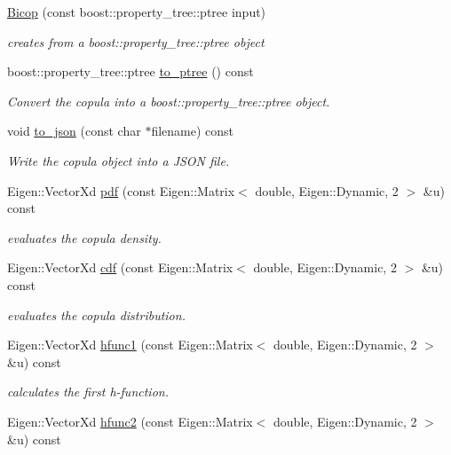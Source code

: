 \begin{DoxyCompactItemize}
\hyperlink{classvinecopulib_1_1_bicop_a48720b451adb23ede4147d4d355f4eaa}{Bicop} (const boost\+::property\+\_\+tree\+::ptree input)
\begin{DoxyCompactList}\small\item\em creates from a boost\+::property\+\_\+tree\+::ptree object \end{DoxyCompactList}\item 
boost\+::property\+\_\+tree\+::ptree \hyperlink{classvinecopulib_1_1_bicop_a74397cf5f843f5aebb436a49322dd2f9}{to\+\_\+ptree} () const
\begin{DoxyCompactList}\small\item\em Convert the copula into a boost\+::property\+\_\+tree\+::ptree object. \end{DoxyCompactList}\item 
void \hyperlink{classvinecopulib_1_1_bicop_a67cec4b86ecdae9ab4bd299fcd53ab60}{to\+\_\+json} (const char $\ast$filename) const
\begin{DoxyCompactList}\small\item\em Write the copula object into a J\+S\+ON file. \end{DoxyCompactList}\item 
Eigen\+::\+Vector\+Xd \hyperlink{classvinecopulib_1_1_bicop_a6c5a0051c17e74760d4eab394245b3f1}{pdf} (const Eigen\+::\+Matrix$<$ double, Eigen\+::\+Dynamic, 2 $>$ \&u) const
\begin{DoxyCompactList}\small\item\em evaluates the copula density. \end{DoxyCompactList}\item 
Eigen\+::\+Vector\+Xd \hyperlink{classvinecopulib_1_1_bicop_a3b0ee4b197e971f83e1d0c357c5ccdd3}{cdf} (const Eigen\+::\+Matrix$<$ double, Eigen\+::\+Dynamic, 2 $>$ \&u) const
\begin{DoxyCompactList}\small\item\em evaluates the copula distribution. \end{DoxyCompactList}\item 
Eigen\+::\+Vector\+Xd \hyperlink{classvinecopulib_1_1_bicop_ae6d42fab3bc19b807f41ccecfc80de46}{hfunc1} (const Eigen\+::\+Matrix$<$ double, Eigen\+::\+Dynamic, 2 $>$ \&u) const
\begin{DoxyCompactList}\small\item\em calculates the first h-\/function. \end{DoxyCompactList}\item 
Eigen\+::\+Vector\+Xd \hyperlink{classvinecopulib_1_1_bicop_a9bbf2e9ab9a04a45e8d98206a46b7596}{hfunc2} (const Eigen\+::\+Matrix$<$ double, Eigen\+::\+Dynamic, 2 $>$ \&u) const

\end{DoxyCompactItemize}

